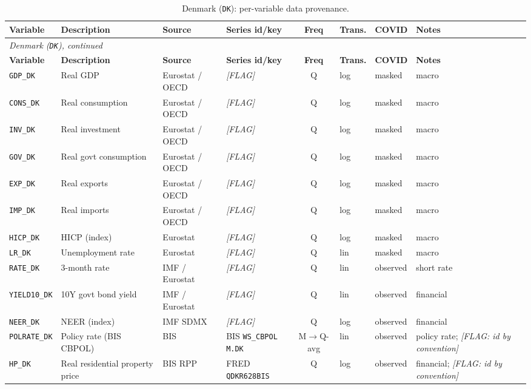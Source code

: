 {\small
\begin{longtable}{@{}lp{2.9cm}p{1.9cm}p{2.0cm}cp{1.4cm}p{1.7cm}p{2.6cm}@{}}
\caption{Denmark (\texttt{DK}): per-variable data provenance.}\label{tab:data:DK}\\
\toprule
\textbf{Variable} & \textbf{Description} & \textbf{Source} & \textbf{Series id/key} & \textbf{Freq} & \textbf{Trans.} & \textbf{COVID} & \textbf{Notes}\\
\midrule
\endfirsthead
\multicolumn{8}{l}{\small\itshape Denmark (\texttt{DK}), continued}\\
\toprule
\textbf{Variable} & \textbf{Description} & \textbf{Source} & \textbf{Series id/key} & \textbf{Freq} & \textbf{Trans.} & \textbf{COVID} & \textbf{Notes}\\
\midrule
\endhead
\bottomrule
\endfoot
\texttt{GDP\_DK} & Real GDP & Eurostat / OECD & \textit{[FLAG]} & Q & log & masked & macro\\
\texttt{CONS\_DK} & Real consumption & Eurostat / OECD & \textit{[FLAG]} & Q & log & masked & macro\\
\texttt{INV\_DK} & Real investment & Eurostat / OECD & \textit{[FLAG]} & Q & log & masked & macro\\
\texttt{GOV\_DK} & Real govt consumption & Eurostat / OECD & \textit{[FLAG]} & Q & log & masked & macro\\
\texttt{EXP\_DK} & Real exports & Eurostat / OECD & \textit{[FLAG]} & Q & log & masked & macro\\
\texttt{IMP\_DK} & Real imports & Eurostat / OECD & \textit{[FLAG]} & Q & log & masked & macro\\
\texttt{HICP\_DK} & HICP (index) & Eurostat & \textit{[FLAG]} & Q & log & masked & macro\\
\texttt{LR\_DK} & Unemployment rate & Eurostat & \textit{[FLAG]} & Q & lin & masked & macro\\
\texttt{RATE\_DK} & 3-month rate & IMF / Eurostat & \textit{[FLAG]} & Q & lin & observed & short rate\\
\texttt{YIELD10\_DK} & 10Y govt bond yield & IMF / Eurostat & \textit{[FLAG]} & Q & lin & observed & financial\\
\texttt{NEER\_DK} & NEER (index) & IMF SDMX & \textit{[FLAG]} & Q & log & observed & financial\\
\texttt{POLRATE\_DK} & Policy rate (BIS CBPOL) & BIS & BIS \texttt{WS\_CBPOL} \texttt{M.DK} & M$\to$Q-avg & lin & observed & policy rate; \textit{[FLAG: id by convention]}\\
\texttt{HP\_DK} & Real residential property price & BIS RPP & FRED \texttt{QDKR628BIS} & Q & log & observed & financial; \textit{[FLAG: id by convention]}\\

\end{longtable}}
